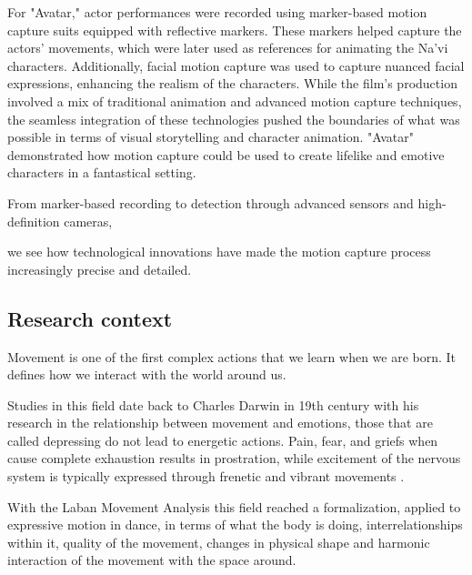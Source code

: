 For "Avatar," actor performances were recorded using marker-based motion capture suits equipped with reflective markers. 
These markers helped capture the actors' movements, which were later used as references for animating the Na'vi characters. 
Additionally, facial motion capture was used to capture nuanced facial expressions, enhancing the realism of the characters.
While the film's production involved a mix of traditional animation and advanced motion capture techniques, 
the seamless integration of these technologies pushed the boundaries of what was possible in terms of visual storytelling 
and character animation. "Avatar" demonstrated how motion capture could be used to 
create lifelike and emotive characters in a fantastical setting.

From marker-based recording to detection through advanced sensors and high-definition cameras,







we see how technological innovations have made the motion capture process increasingly precise and detailed.

\subsection{Research context}
Movement is one of the first complex actions that we learn when we are born. 
It defines how we interact with the world around us. 

Studies in this field date back to Charles Darwin in 19th century with his research in the relationship 
between movement and emotions, those that are called depressing do not lead to energetic actions. 
Pain, fear, and griefs when cause complete exhaustion results in prostration, 
while excitement of the nervous system is typically expressed through frenetic and vibrant movements \cite{darwin}.  

With the Laban Movement Analysis this field reached a formalization, applied to expressive motion in dance, 
in terms of what the body is doing, interrelationships within it, quality of the movement, 
changes in physical shape and harmonic interaction of the movement with the space around. 

